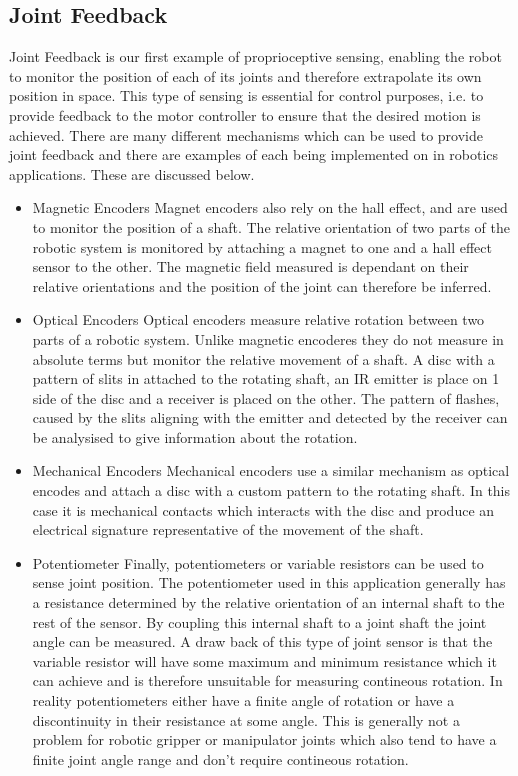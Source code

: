\subsection{Joint Feedback}
Joint Feedback is our first example of proprioceptive sensing, enabling the robot to monitor the position of each of its joints and therefore extrapolate its own position in space. This type of sensing is essential for control purposes, i.e. to provide feedback to the motor controller to ensure that the desired motion is achieved. There are many different mechanisms which can be used to provide joint feedback and there are examples of each being implemented on in robotics applications. These are discussed below.
\begin{itemize}
    \item Magnetic Encoders
    Magnet encoders also rely on the hall effect, and are used to monitor the position of a shaft. The relative orientation of two parts of the robotic system is monitored by attaching a magnet to one and a hall effect sensor to the other. The magnetic field measured is dependant on their relative orientations and the position of the joint can therefore be inferred.
    \item Optical Encoders
    Optical encoders measure relative rotation between two parts of a robotic system. Unlike magnetic encoderes they do not measure in absolute terms but monitor the relative movement of a shaft. A disc with a pattern of slits in attached to the rotating shaft, an IR emitter is place on 1 side of the disc and a receiver is placed on the other. The pattern of flashes, caused by the slits aligning with the emitter and detected by the receiver can be analysised to give information about the rotation. 
    \item Mechanical Encoders
    Mechanical encoders use a similar mechanism as optical encodes and attach a disc with a custom pattern to the rotating shaft. In this case it is mechanical contacts which interacts with the disc and produce an electrical signature representative of the movement of the shaft.
    \item Potentiometer
    Finally, potentiometers or variable resistors can be used to sense joint position. The potentiometer used in this application generally has a resistance determined by the relative orientation of an internal shaft to the rest of the sensor. By coupling this internal shaft to a joint shaft the joint angle can be measured. A draw back of this type of joint sensor is that the variable resistor will have some maximum and minimum resistance which it can achieve and is therefore unsuitable for measuring contineous rotation. In reality potentiometers either have a finite angle of rotation or have a discontinuity in their resistance at some angle. This is generally not a problem for robotic gripper or manipulator joints which also tend to have a finite joint angle range and don't require contineous rotation.
\end{itemize}

